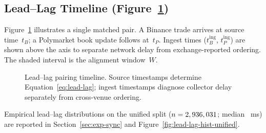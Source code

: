 \subsection{Lead--Lag Timeline (Figure~\ref{fig:lead-lag-timeline})}

Figure~\ref{fig:lead-lag-timeline} illustrates a single matched pair.
A Binance trade arrives at source time~$t_B$; a Polymarket book update
follows at~$t_P$. Ingest times ($t_B^{\mathrm{ing}}$, $t_P^{\mathrm{ing}}$)
are shown above the axis to separate network delay from exchange-reported
ordering. The shaded interval is the alignment window~$W$.

\begin{figure}[t]
  \centering
  \caption{Lead--lag pairing timeline. Source timestamps determine
    Equation~\eqref{eq:lead-lag}; ingest timestamps diagnose collector
    delay separately from cross-venue ordering.}
  \label{fig:lead-lag-timeline}
\end{figure}

Empirical lead--lag distributions on the unified split ($n=2,936,031{}$;
median \OpenMarketLagMedian{}~ms) are reported in
Section~\ref{sec:exp-sync} and Figure~\ref{fig:lead-lag-hist-unified}.

